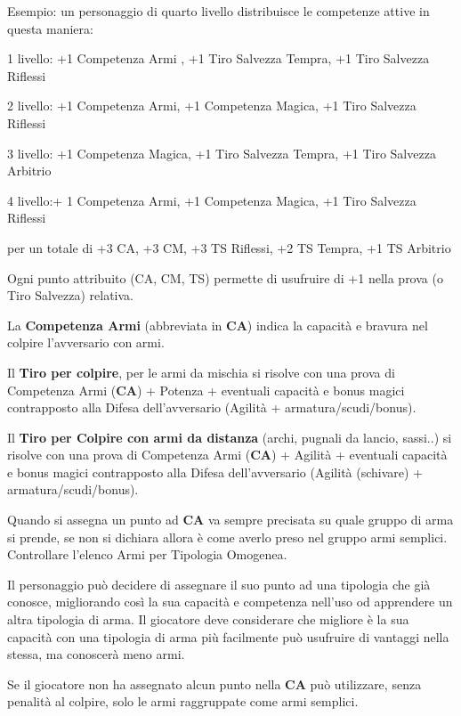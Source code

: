 \documentclass[a4paper,11pt,twoside,openany]{book}
\begin{document}
\bigskip

Esempio: un personaggio di quarto livello distribuisce le competenze
attive in questa maniera:

1 livello: +1 Competenza Armi , +1 Tiro Salvezza Tempra, +1 Tiro Salvezza Riflessi

2 livello: +1 Competenza Armi, +1 Competenza Magica, +1 Tiro Salvezza Riflessi

3 livello: +1 Competenza Magica, +1 Tiro Salvezza Tempra, +1 Tiro Salvezza Arbitrio

4 livello:+ 1 Competenza Armi, +1 Competenza Magica, +1 Tiro Salvezza Riflessi

per un totale di +3 CA, +3 CM, +3 TS Riflessi, +2 TS Tempra, +1 TS Arbitrio

\bigskip

Ogni punto attribuito (CA, CM, TS) permette di usufruire di +1 nella prova (o Tiro Salvezza) relativa.

La \textbf{Competenza Armi} (abbreviata in \textbf{CA}) indica la capacità e bravura nel colpire l'avversario con armi.

Il \textbf{Tiro per colpire}, per le armi da mischia si risolve con una prova di Competenza Armi (\textbf{CA}) + Potenza + eventuali capacità e bonus magici contrapposto alla Difesa dell'avversario (Agilità + armatura/scudi/bonus).

Il \textbf{Tiro per Colpire con armi da distanza} (archi, pugnali da lancio, sassi..) si risolve con una prova di Competenza Armi (\textbf{CA}) + Agilità + eventuali capacità e bonus magici contrapposto alla Difesa dell'avversario (Agilità (schivare) + armatura/scudi/bonus).

Quando si assegna un punto ad \textbf{CA} va sempre precisata su quale gruppo di arma si prende, se non si dichiara allora è come averlo preso nel gruppo armi semplici.
Controllare l'elenco Armi per Tipologia Omogenea.

Il personaggio può decidere di assegnare il suo punto ad una tipologia che già conosce, migliorando così la sua capacità e competenza nell'uso od apprendere un altra tipologia di arma. 
Il giocatore deve considerare che migliore è la sua capacità con una tipologia di arma più facilmente può usufruire di vantaggi nella stessa, ma conoscerà meno armi.

Se il giocatore non ha assegnato alcun punto nella \textbf{CA} può utilizzare, senza penalità al colpire, solo le armi raggruppate come armi semplici.
\end{document}

